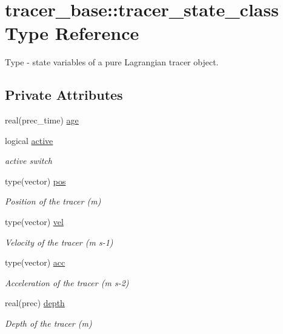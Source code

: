 \hypertarget{structtracer__base_1_1tracer__state__class}{}\section{tracer\+\_\+base\+:\+:tracer\+\_\+state\+\_\+class Type Reference}
\label{structtracer__base_1_1tracer__state__class}


Type -\/ state variables of a pure Lagrangian tracer object.  


\subsection*{Private Attributes}
\begin{DoxyCompactItemize}
\item 
real(prec\+\_\+time) \hyperlink{structtracer__base_1_1tracer__state__class_a23ee8b78946c85f5e079ad0f5fc08b29}{age}
\item 
logical \hyperlink{structtracer__base_1_1tracer__state__class_aeb73b96dfbc525803fab32c3d3ae3ab8}{active}
\begin{DoxyCompactList}\small\item\em active switch \end{DoxyCompactList}\item 
type(vector) \hyperlink{structtracer__base_1_1tracer__state__class_a3c966719f4a6961697a7e939694cb550}{pos}
\begin{DoxyCompactList}\small\item\em Position of the tracer (m) \end{DoxyCompactList}\item 
type(vector) \hyperlink{structtracer__base_1_1tracer__state__class_a46296517bb40271bcff0fe9c85024e7c}{vel}
\begin{DoxyCompactList}\small\item\em Velocity of the tracer (m s-\/1) \end{DoxyCompactList}\item 
type(vector) \hyperlink{structtracer__base_1_1tracer__state__class_a5a66d6eaa3610d07fe073a04727ffb6e}{acc}
\begin{DoxyCompactList}\small\item\em Acceleration of the tracer (m s-\/2) \end{DoxyCompactList}\item 
real(prec) \hyperlink{structtracer__base_1_1tracer__state__class_a87200472c310a7b3f95653cd43eda82f}{depth}
\begin{DoxyCompactList}\small\item\em Depth of the tracer (m) \end{DoxyCompactList}\end{DoxyCompactItemize}


